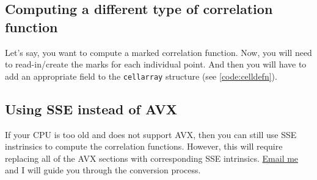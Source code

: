 \documentclass[12pt,titlepage]{article}
\begin{document}
\subsection{Computing a different type of correlation function}
Let's say, you want to compute a marked correlation function. Now, you will need to read-in/create the marks for each individual point. And then you will have to add an 
appropriate field to the \texttt{cellarray} structure (see \ref{code:celldefn}). 

\subsection{Using SSE instead of AVX}
If your CPU is too old and does not support AVX, then you can still use SSE instrinsics to compute the correlation functions. However, this will require replacing all of the 
AVX sections with corresponding SSE intrinsics. \href{mailto:manodeep@gmail.com}{Email me} and I will guide you through the conversion process. 

\end{document}
